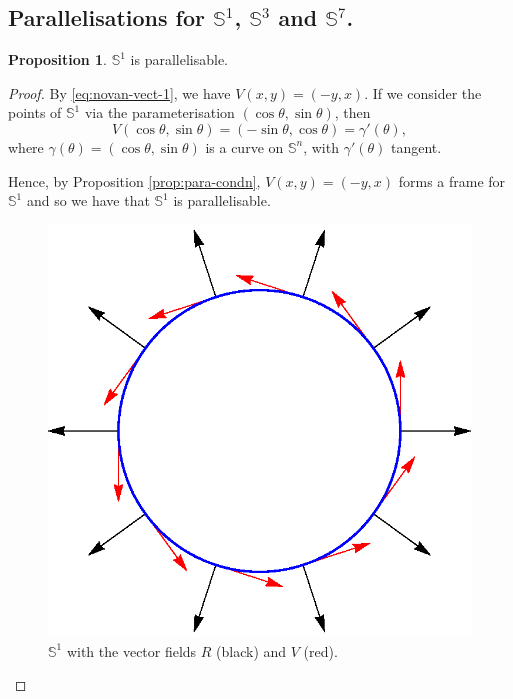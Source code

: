 \documentclass[12pt,a4paper]{article}
\numberwithin{equation}{section}
\theoremstyle{definition}
\newtheorem{proposition}{Proposition}[section]
\theoremstyle{remark}
\begin{document}
\subsection{Parallelisations for $\mathbb{S}^1$, $\mathbb{S}^3$ and $\mathbb{S}^7$.}
\begin{proposition}
$\mathbb{S}^1$ is parallelisable.
\end{proposition}
\begin{proof}
By \eqref{eq:novan-vect-1}, we have $V(x,y)=(-y,x)$. If we consider the points of $\mathbb{S}^1$ via the parameterisation $(\cos\theta,\sin\theta)$, then
\[
V(\cos\theta,\sin\theta)=(-\sin\theta,\cos\theta)=\gamma'(\theta),
\] 
where $\gamma(\theta)=(\cos\theta,\sin\theta)$ is a curve on $\mathbb{S}^n$, with $\gamma'(\theta)$ tangent.

Hence, by Proposition \ref{prop:para-condn}, $V(x,y)=(-y,x)$ forms a frame for $\mathbb{S}^1$ and so we have that $\mathbb{S}^1$ is parallelisable.

\begin{figure}[h!]
\centering
\includegraphics[scale=0.75]{fig/s1-norm-tang}
\caption{$\mathbb{S}^1$ with the vector fields $R$ (black) and $V$ (red).}
\label{fig:s1+norm+tang}
\end{figure}
\end{proof}
\end{document}
